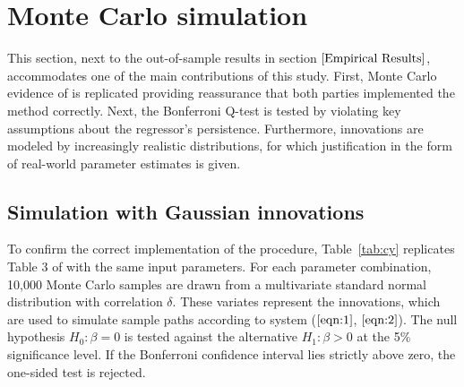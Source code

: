 \documentclass{article}
\begin{document}
\section{Monte Carlo simulation}
This section, next to the out-of-sample results in section $\ref{Empirical Results}$, accommodates one of the main contributions of this study. First, Monte Carlo evidence of \citet{campbell2006efficient} is replicated providing reassurance that both parties implemented the method correctly. Next, the Bonferroni Q-test is tested by violating key assumptions about the regressor's persistence. Furthermore, innovations are modeled by increasingly realistic distributions, for which justification in the form of real-world parameter estimates is given.
\label{Monte Carlo simulation}
\subsection{Simulation with Gaussian innovations}
\label{Simulation with Gaussian innovations}
To confirm the correct implementation of the procedure, Table~\vref{tab:cy} replicates Table 3 of \citet{campbell2006efficient} with the same input parameters. For each parameter combination, 10,000 Monte Carlo samples are drawn from a multivariate standard normal distribution with correlation $\delta$. These variates represent the innovations, which are used to simulate sample paths according to system ($\ref{eqn:1}$, $\ref{eqn:2}$). The null hypothesis $H_0: \beta = 0$ is tested against the alternative $H_1: \beta > 0$ at the 5\% significance level. If the Bonferroni confidence interval lies strictly above zero, the one-sided test is rejected. 
\end{document}
